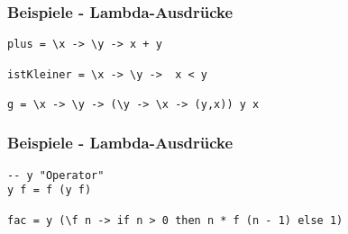 \begin{frame}[fragile]
\frametitle{Beispiele - Lambda-Ausdrücke}
\begin{lstlisting}
plus = \x -> \y -> x + y

istKleiner = \x -> \y ->  x < y

g = \x -> \y -> (\y -> \x -> (y,x)) y x
\end{lstlisting}
\end{frame}

\begin{frame}[fragile]
\frametitle{Beispiele - Lambda-Ausdrücke}
\begin{lstlisting}
-- y "Operator"
y f = f (y f)

fac = y (\f n -> if n > 0 then n * f (n - 1) else 1)
\end{lstlisting}
\end{frame}

